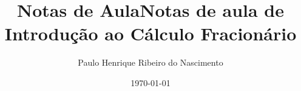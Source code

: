 \documentclass[
ebook,%
extrafontsizes,
14pt,%
oneside,%
a4paper,%
onecolumn,  %
english,%
brazil,%
sumario=tradicional
]{abntex2}
\title{Notas de Aula} %
\author{Paulo Henrique Ribeiro do Nascimento}%
\date{\today}%
\makeatletter
\let\thetitle\@title
\let\thedate\@date
\makeatother
\begin{document}
\begin{sansmath}
\helveticafamily
\def\normalfont{\helveticafamily}





\def\capa{
\centering
\textsc{\LARGE \newline\newline Universidade Estadual de Campinas} \\[2.0 cm]%
\textsc{\Large MT-624: Biomatemática I}\\[0.5 cm] %
\rule{\linewidth}{0.2 mm} \\[0.4 cm]
{ \huge \textbf{\thetitle}} \\
\rule{\linewidth}{0.2 mm} \\[1.5 cm]

\begin{minipage}{0.45\textwidth}
\begin{flushleft} \large
\emph{Professor:} \\
Wilson Castro Ferreira Jr \\
IMECC-UNICAMP \\
\end{flushleft}
\end{minipage}
\begin{minipage}{0.45\textwidth}
\begin{flushright} \large
\emph{Estudante:} \\
Paulo Henrique Ribeiro do Nascimento \\
CETEC-UFRB
\end{flushright}
\end{minipage}


\vspace{6cm}

\begin{center}
\thedate
\end{center}


\clearpage
}




\tableofcontents
\pagebreak


\title{Notas de aula de Introdução ao Cálculo Fracionário}



\end{sansmath}
\end{document}
